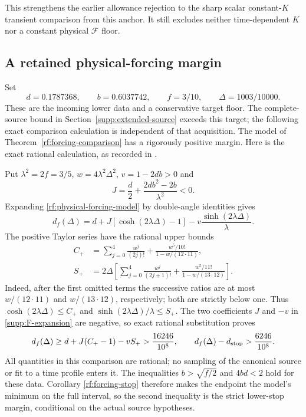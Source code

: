 This strengthens the earlier allowance rejection to the sharp scalar
constant-$K$ transient comparison from this anchor. It still excludes
neither time-dependent $K$ nor a constant physical $\mathcal F$ floor.

\subsection{A retained physical-forcing margin}
\label{supp:retained-F}

Set
\[
 d=0.1787368,\qquad b=0.6037742,\qquad f=3/10,\qquad
 \Delta=1003/10000.
\]
These are the incoming lower data and a conservative target floor.
The complete-source bound in Section~\ref{supp:extended-source} exceeds
this target; the following exact comparison calculation is independent
of that acquisition. The model of
Theorem~\ref{rf:forcing-comparison} has a rigorously positive margin.
Here is the exact rational calculation, as recorded in
\cite{BakerCM32,BakerCMReview29}.

Put $\lambda^2=2f=3/5$, $w=4\lambda^2\Delta^2$, $v=1-2db>0$ and
\[
 J=\frac d2+\frac{2db^2-2b}{\lambda^2}<0.
\]
Expanding \eqref{rf:physical-forcing-model} by double-angle identities
gives
\begin{equation}
 d_f(\Delta)=d+J[\cosh(2\lambda\Delta)-1]
                    -v\frac{\sinh(2\lambda\Delta)}{\lambda}.
 \label{supp:F-expansion}
\end{equation}
The positive Taylor series have the rational upper bounds
\begin{align*}
 C_+&=\sum_{j=0}^4\frac{w^j}{(2j)!}
       +\frac{w^5/10!}{1-w/(12\cdot11)},\\
 S_+&=2\Delta\left[
        \sum_{j=0}^4\frac{w^j}{(2j+1)!}
        +\frac{w^5/11!}{1-w/(13\cdot12)}\right].
\end{align*}
Indeed, after the first omitted terms the successive ratios are at
most $w/(12\cdot11)$ and $w/(13\cdot12)$, respectively; both are
strictly below one. Thus
$\cosh(2\lambda\Delta)\le C_+$ and
$\sinh(2\lambda\Delta)/\lambda\le S_+$.
The two coefficients $J$ and $-v$ in \eqref{supp:F-expansion} are
negative, so exact rational substitution proves
\begin{equation}
 d_f(\Delta)\ge d+J(C_+-1)-vS_+
       >\frac{16246}{10^8},\qquad
 d_f(\Delta)-d_{\rm stop}>\frac{6246}{10^8}.
 \label{supp:F-margin}
\end{equation}
All quantities in this comparison are rational; no sampling of the
canonical source or fit to a time profile enters it. The inequalities
$b>\sqrt{f/2}$ and $4bd<2$ hold for these data. Corollary
\ref{rf:forcing-stop} therefore makes the endpoint the model's minimum
on the full interval, so the second inequality is the strict lower-stop
margin, conditional on the actual source hypotheses.

